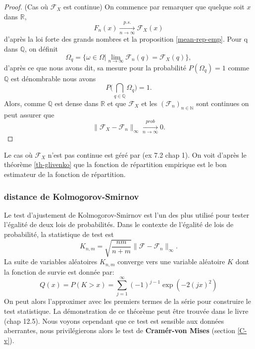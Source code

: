\documentclass[a4paper,10pt]{article}
\begin{document}
\begin{proof} (Cas où $\mathcal{F}_X$ est continue)
	On commence par remarquer que quelque soit $x$ dans $\mathbb{R}$, \[F_{n}(x)\xrightarrow[n\to \infty]{p.s.}\mathcal{F}_X(x)\] d'après la loi forte des grands nombres et la proposition \eqref{mean-rep-emp}. Pour q dans $\mathbb{Q}$, on définit 
	\[\Omega_{q}=\{\omega \in \Omega | \lim_{n \to \infty} \mathcal{F}_{n}(q)=\mathcal{F}_X(q)\},\]
	d'après ce que nous avons dit, sa mesure pour la probabilité $P(\Omega_q)=1$ comme $\mathbb{Q}$ est dénombrable nous avons  
	\[P\Big(\bigcap_{q \in \mathbb{Q}} \Omega_q \Big)=1.\]
	Alors, comme $\mathbb{Q}$ est dense dans $\mathbb{R}$ et que $\mathcal{F}_{X}$ et les $(\mathcal{F}_n)_{n \in \mathbb{N}}$ sont continues on peut assurer que   
	\[	\|\mathcal{F}_{X}-\mathcal{F}_{n}\|_{\infty} \xrightarrow[n\to \infty]{prob} 0. \]
\end{proof}
Le cas où $\mathcal{F}_{X}$ n'est pas continue est géré par \cite{durrett2019probability} (ex 7.2 chap 1). On voit d'après le théorème \ref{th-glivenko} que la fonction de répartition empirique est le bon estimateur de la fonction de répartition. 
\subsubsection{distance de Kolmogorov-Smirnov}

Le test d'ajustement  de  Kolmogorov-Smirnov est  l'un des plus  utilisé pour tester l'égalité de deux lois  de probabilités. Dans  le  contexte de  l'égalité de lois  de probabilité, la statistique  de  test  est 
\[K_{n,m}= \sqrt{\frac{nm}{n+m}}\|\mathcal{F}-\mathcal{F}_n\|_{\infty}.\]
La suite de variables aléatoires $K_{n,m}$ converge vers une variable aléatoire $K$ dont la fonction de survie est donnée par: 
\begin{equation}
	Q(x)=P(K>x)=\sum_{j=1}^{\infty}(-1)^{j-1}\exp(-2(jx)^2)
\end{equation}
On peut alors l'approximer avec les premiers termes de la série pour construire le test statistique. La démonstration de ce théorème peut être trouvée dans le livre \cite{walker1965probability}(chap 12.5). Nous voyons cependant que ce test est sensible aux données aberrantes, nous privilégierons alors le test de \textbf{Cramér-von Mises} (section \ref{C-v}).
\end{document}
